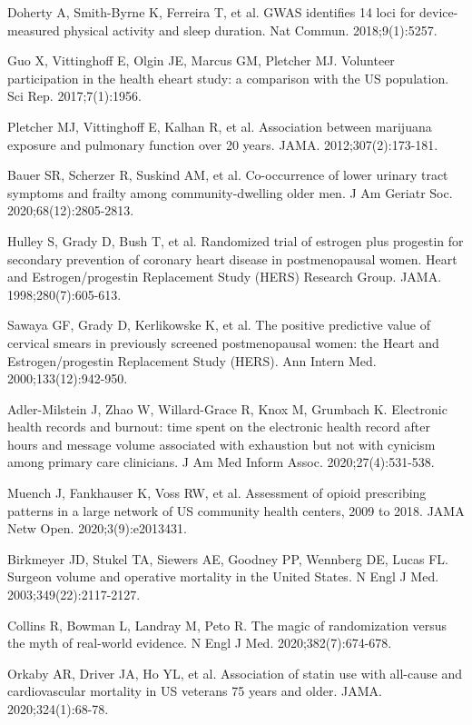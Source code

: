 \begin{references}
\item Doherty A, Smith-Byrne K, Ferreira T, et al. GWAS identifies 14 loci for device-measured physical activity and sleep duration. Nat Commun. 2018;9(1):5257.
\item Guo X, Vittinghoff E, Olgin JE, Marcus GM, Pletcher MJ. Volunteer participation in the health eheart study: a comparison with the US population. Sci Rep. 2017;7(1):1956.
\item Pletcher MJ, Vittinghoff E, Kalhan R, et al. Association between marijuana exposure and pulmonary function over 20 years. JAMA. 2012;307(2):173-181.
\item Bauer SR, Scherzer R, Suskind AM, et al. Co-occurrence of lower urinary tract symptoms and frailty among community-dwelling older men. J Am Geriatr Soc. 2020;68(12):2805-2813.
\item Hulley S, Grady D, Bush T, et al. Randomized trial of estrogen plus progestin for secondary prevention of coronary heart disease in postmenopausal women. Heart and Estrogen/progestin Replacement Study (HERS) Research Group. JAMA. 1998;280(7):605-613.
\item Sawaya GF, Grady D, Kerlikowske K, et al. The positive predictive value of cervical smears in previously screened postmenopausal women: the Heart and Estrogen/progestin Replacement Study (HERS). Ann Intern Med. 2000;133(12):942-950.
\item Adler-Milstein J, Zhao W, Willard-Grace R, Knox M, Grumbach K. Electronic health records and burnout: time spent on the electronic health record after hours and message volume associated with exhaustion but not with cynicism among primary care clinicians. J Am Med Inform Assoc. 2020;27(4):531-538.
\item Muench J, Fankhauser K, Voss RW, et al. Assessment of opioid prescribing patterns in a large network of US community health centers, 2009 to 2018. JAMA Netw Open. 2020;3(9):e2013431.
\item Birkmeyer JD, Stukel TA, Siewers AE, Goodney PP, Wennberg DE, Lucas FL. Surgeon volume and operative mortality in the United States. N Engl J Med. 2003;349(22):2117-2127.
\item Collins R, Bowman L, Landray M, Peto R. The magic of randomization versus the myth of real-world evidence. N Engl J Med. 2020;382(7):674-678.
\item Orkaby AR, Driver JA, Ho YL, et al. Association of statin use with all-cause and cardiovascular mortality in US veterans 75 years and older. JAMA. 2020;324(1):68-78.

\end{references}
